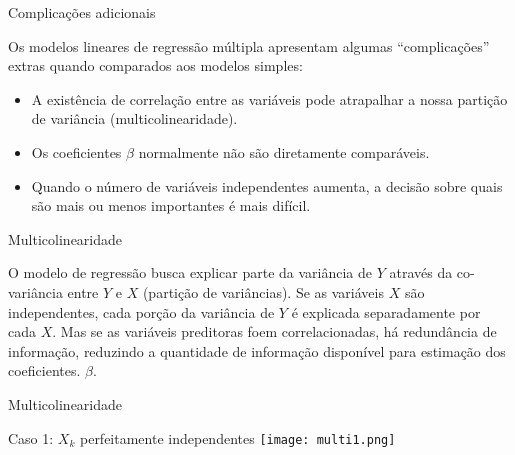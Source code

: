 \documentclass{beamer}\usepackage[]{graphicx}\usepackage[]{color}
\begin{document}
\begin{frame}{Complicações adicionais}

Os modelos lineares de regressão múltipla apresentam algumas ``complicações'' extras quando comparados aos modelos simples:
\vfill
\begin{itemize}

\item A existência de correlação entre as variáveis pode atrapalhar a nossa partição de variância (multicolinearidade). \pause
\vfill
\item Os coeficientes $\beta$ normalmente não são diretamente comparáveis. \pause
\vfill
\item Quando o número de variáveis independentes aumenta, a decisão sobre quais são mais ou menos importantes é mais difícil.
\vfill

\end{itemize}

\end{frame}


\begin{frame}{Multicolinearidade}

O modelo de regressão busca explicar parte da variância de $Y$ através da co-variância entre $Y$ e $X$ (partição de variâncias).
\vfill
Se as variáveis $X$ são independentes, cada porção da variância de $Y$ é explicada separadamente por cada $X$.
\vfill
Mas se as variáveis preditoras foem correlacionadas, há redundância de informação, reduzindo a quantidade de informação disponível para estimação dos coeficientes. $\beta$.
\vfill


\end{frame}


\begin{frame}{Multicolinearidade}

Caso 1: $X_k$ perfeitamente independentes
\vfill
\texttt{[image: multi1.png]}


\end{frame}
\end{document}
